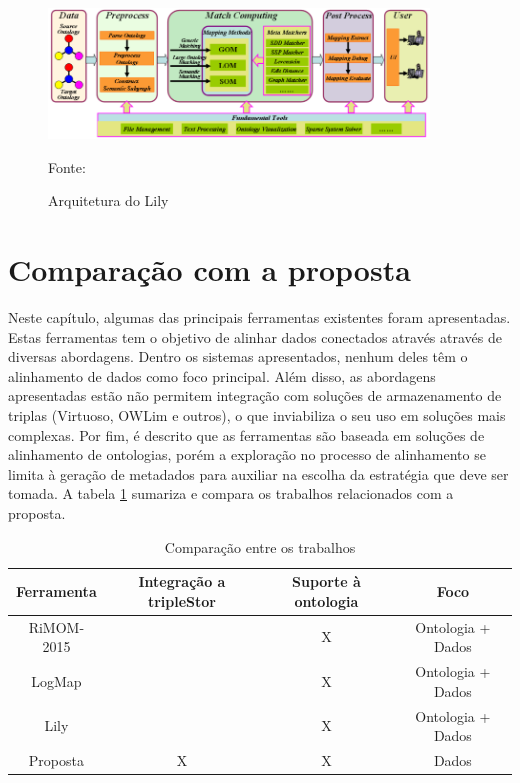 \begin{figure}[!ht]
	\centering
	\includegraphics[width=0.9\textwidth]{./imagens/lily.png}
    \caption{Arquitetura do Lily}
	\footnotesize{Fonte: \cite{euzenat2013d}}
	\label{fig:lily}
\end{figure}

\section*{Comparação com a proposta}

Neste capítulo, algumas das principais ferramentas existentes foram apresentadas. Estas ferramentas tem o objetivo de alinhar dados conectados através através de diversas abordagens.
Dentro os sistemas apresentados, nenhum deles têm o alinhamento de dados como foco principal. Além disso, as abordagens apresentadas estão não permitem integração com soluções de armazenamento de triplas (Virtuoso, OWLim e outros), o que inviabiliza o seu uso em soluções mais complexas. Por fim, é descrito que as ferramentas são baseada em soluções de alinhamento de ontologias, porém a exploração no processo de alinhamento se limita à geração de metadados para auxiliar na escolha da estratégia que deve ser tomada. A tabela \ref{tab:comparacao} sumariza e compara os trabalhos relacionados com a proposta.

\begin{table}[h]
\centering
\caption{Comparação entre os trabalhos}
\label{tab:comparacao}
\begin{tabular}{@{}cccc@{}}
\toprule
Ferramenta & Integração a tripleStor & Suporte à ontologia & Foco               \\ \midrule
RiMOM-2015 &                         & X                   & Ontologia + Dados \\
LogMap     &                         & X                   & Ontologia + Dados \\
Lily       &                         & X                   & Ontologia + Dados \\
Proposta   & X                       & X                   & Dados             \\ \midrule
\end{tabular}
\end{table}
